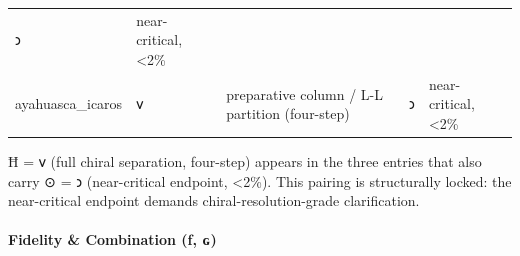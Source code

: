 \begin{longtable}[]{@{}lllll@{}}
\begin{minipage}[t]{0.17\columnwidth}
𐑮\strut
\end{minipage} & \begin{minipage}[t]{0.17\columnwidth}\raggedright
near-critical, \textless2\%\strut
\end{minipage}\tabularnewline
\begin{minipage}[t]{0.17\columnwidth}\raggedright
ayahuasca\_icaros\strut
\end{minipage} & \begin{minipage}[t]{0.17\columnwidth}\raggedright
𐑫\strut
\end{minipage} & \begin{minipage}[t]{0.17\columnwidth}\raggedright
preparative column / L-L partition (four-step)\strut
\end{minipage} & \begin{minipage}[t]{0.17\columnwidth}\raggedright
𐑮\strut
\end{minipage} & \begin{minipage}[t]{0.17\columnwidth}\raggedright
near-critical, \textless2\%\strut
\end{minipage}\tabularnewline
\bottomrule
\end{longtable}

Ħ = 𐑫 (full chiral separation, four-step) appears in the three entries
that also carry ⊙ = 𐑮 (near-critical endpoint, \textless2\%). This
pairing is structurally locked: the near-critical endpoint demands
chiral-resolution-grade clarification.

\hypertarget{fidelity-combination-ux192-ux262}{%
\paragraph{Fidelity \& Combination (ƒ,
ɢ)}\label{fidelity-combination-ux192-ux262}}

